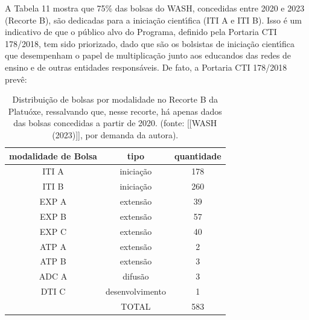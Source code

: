 \documentclass[
12pt,		%
openright,	%
twoside,  %
a4paper,			%
chapter=TITLE,		%
english,			%
french,				%
spanish,			%
brazil				%
]{USPSC-classe/USPSC}
\begin{document}
A Tabela 11 mostra que 75\% das bolsas do WASH, concedidas entre 2020 e 2023 (Recorte B), s\~ao dedicadas para a inicia\c{c}\~ao cient\'{\i}fica (ITI A e ITI B). Isso \'e um indicativo de que o p\'ublico alvo do Programa, definido pela Portaria CTI 178/2018, tem sido priorizado, dado que s\~ao os bolsistas de inicia\c{c}\~ao cient\'{\i}fica que desempenham o papel de multiplica\c{c}\~ao junto aos educandos das redes de ensino e de outras entidades respons\'aveis. De fato, a Portaria CTI 178/2018 prev\^e:


















\noindent\begin{center}\mbox{\centering{}}\end{center}






\begin{table}[htb]
\tiny
\caption{\label{2422b7c7fe35ecc5010472438083776a7ed64d61}Distribui\c{c}\~ao de bolsas por modalidade no Recorte B da Platu\'oxe, ressalvando que, nesse recorte, h\'a apenas dados das bolsas concedidas a partir de 2020. (fonte:  [[WASH (2023)]], por demanda da autora).}

\centering
\begin{tabular}{|c|c|c|}
\hline
modalidade de Bolsa  &  tipo  &  quantidade \\
\hline
ITI A  &  inicia\c{c}\~ao  &  178 \\
ITI B  &  inicia\c{c}\~ao  &  260 \\
EXP A  &  extens\~ao  &  39 \\
EXP B  &  extens\~ao  &  57 \\
EXP C  &  extens\~ao  &  40 \\
ATP A  &  extens\~ao  &  2 \\
ATP B  &  extens\~ao  &  3 \\
ADC A  &  difus\~ao  &  3 \\
DTI C  &  desenvolvimento  &  1 \\
\hline
  &  TOTAL  &  583 \\
\hline
\end{tabular}
\end{table}
\end{document}
